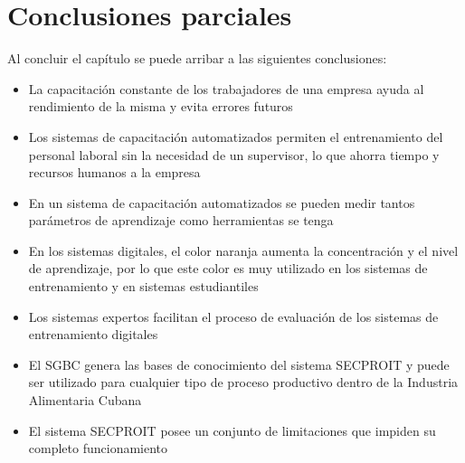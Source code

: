 \section{Conclusiones parciales}
Al concluir el capítulo se puede arribar a las siguientes conclusiones:
\begin{itemize}
\item La capacitación constante de los trabajadores de una empresa ayuda al rendimiento de la misma y evita errores futuros
\item Los sistemas de capacitación automatizados permiten el entrenamiento del personal laboral sin la necesidad de un supervisor, lo que ahorra tiempo y recursos humanos a la empresa
\item En un sistema de capacitación automatizados se pueden medir tantos parámetros de aprendizaje como herramientas se tenga
\item En los sistemas digitales, el color naranja aumenta la concentración y el nivel de aprendizaje, por lo que este color es muy utilizado en los sistemas de entrenamiento y en sistemas estudiantiles
\item Los sistemas expertos facilitan el proceso de evaluación de los sistemas de entrenamiento digitales
\item El SGBC genera las bases de conocimiento del sistema SECPROIT y puede ser utilizado para cualquier tipo de proceso productivo dentro de la Industria Alimentaria Cubana
\item El sistema SECPROIT posee un conjunto de limitaciones que impiden su completo funcionamiento
\end{itemize}